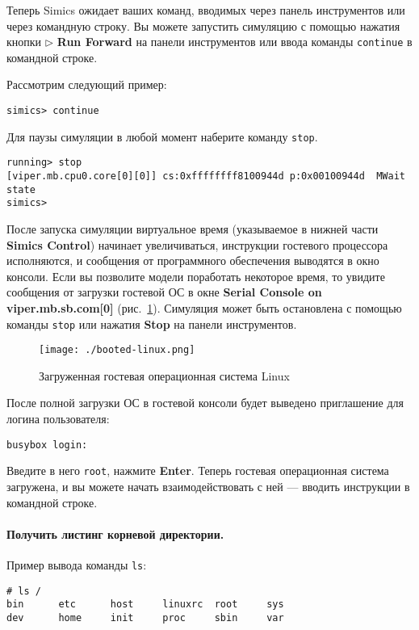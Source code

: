 Теперь Simics ожидает ваших команд, вводимых через панель инструментов или через командную строку. Вы можете запустить симуляцию с помощью нажатия кнопки $\triangleright$ \textbf{Run Forward} на панели инструментов или ввода команды \texttt{continue} в командной строке.

Рассмотрим следующий пример:

\begin{lstlisting}
simics> continue
\end{lstlisting}

Для паузы симуляции в любой момент наберите команду \texttt{stop}.

\begin{lstlisting}
running> stop
[viper.mb.cpu0.core[0][0]] cs:0xffffffff8100944d p:0x00100944d  MWait state
simics>
\end{lstlisting}

После запуска симуляции виртуальное время (указываемое в нижней части \textbf{Simics Control}) начинает увеличиваться, инструкции гостевого процессора исполняются, и сообщения от программного обеспечения выводятся в окно консоли. Если вы позволите модели поработать некоторое время, то увидите сообщения от загрузки гостевой ОС в окне \textbf{Serial Console on viper.mb.sb.com[0]} (рис.~\ref{fig:booted-linux}). Симуляция может быть остановлена с помощью команды \texttt{stop} или нажатия \textbf{Stop} на панели инструментов.

\begin{figure}
	\centering
	\texttt{[image: ./booted-linux.png]}
	\caption{Загруженная гостевая операционная система Linux}
	\label{fig:booted-linux}
\end{figure}

После полной загрузки ОС в гостевой консоли будет выведено приглашение для логина пользователя:
\begin{lstlisting}
busybox login:
\end{lstlisting}

Введите в него \texttt{root}, нажмите \textbf{Enter}. Теперь гостевая операционная система загружена, и вы можете начать взаимодействовать с ней --- вводить инструкции в командной строке.

\paragraph{Получить листинг корневой директории.} Пример вывода команды \texttt{ls}:

\begin{lstlisting}
# ls /
bin      etc      host     linuxrc  root     sys
dev      home     init     proc     sbin     var
\end{lstlisting}

